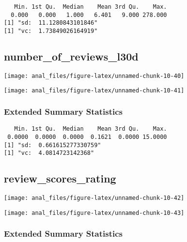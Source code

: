 \begin{verbatim}   Min. 1st Qu.  Median    Mean 3rd Qu.    Max. 
  0.000   0.000   1.000   6.401   9.000 278.000 
[1] "sd:  11.1280843101846"
[1] "vc:  1.73849026164919"
\end{verbatim}

\pagebreak

\hypertarget{number_of_reviews_l30d}{%
\subsection{number\_of\_reviews\_l30d}\label{number_of_reviews_l30d}}

\begin{center}\texttt{[image: anal\_files/figure-latex/unnamed-chunk-10-40]} \end{center}

\begin{center}\texttt{[image: anal\_files/figure-latex/unnamed-chunk-10-41]} \end{center}

\hypertarget{extended-summary-statistics-13}{%
\subsubsection{Extended Summary
Statistics}\label{extended-summary-statistics-13}}

\begin{verbatim}   Min. 1st Qu.  Median    Mean 3rd Qu.    Max. 
 0.0000  0.0000  0.0000  0.1621  0.0000 15.0000 
[1] "sd:  0.661615277330759"
[1] "vc:  4.0814723142368"
\end{verbatim}

\pagebreak

\hypertarget{review_scores_rating}{%
\subsection{review\_scores\_rating}\label{review_scores_rating}}

\begin{center}\texttt{[image: anal\_files/figure-latex/unnamed-chunk-10-42]} \end{center}

\begin{center}\texttt{[image: anal\_files/figure-latex/unnamed-chunk-10-43]} \end{center}

\hypertarget{extended-summary-statistics-14}{%
\subsubsection{Extended Summary
Statistics}\label{extended-summary-statistics-14}}

